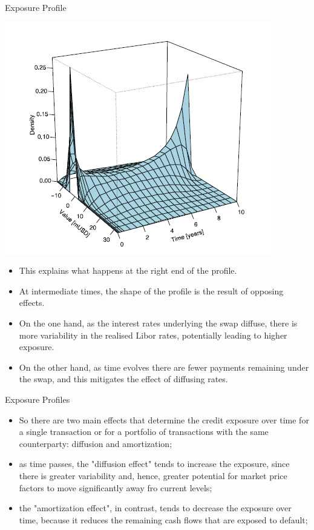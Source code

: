 \documentclass[11pt]{beamer}
\begin{document}
\begin{frame}{Exposure Profile}
\noindent\begin{minipage}{0.5\textwidth}%
\includegraphics[width=\linewidth]{img/profilo_3.png}
\end{minipage}%
\hfill%
\begin{minipage}{0.5\textwidth}
\begin{itemize}
\footnotesize
\item This explains what happens at the right end of the profile. 
\item At intermediate times, the
shape of the profile is the result of opposing effects. 
\item On the one hand, as the interest
rates underlying the swap diffuse, there is more variability in the realised Libor rates,
potentially leading to higher exposure. 
\item On the other hand, as time evolves there are
fewer payments remaining under the swap, and this mitigates the effect of diffusing
rates.
\normalsize
\end{itemize}
\end{minipage}
\end{frame}
\begin{frame}{Exposure Profiles}
\begin{itemize}
\item So there are two main effects that determine the credit exposure over time for a single transaction or for a portfolio of transactions with the same counterparty: diffusion and amortization;
\item as time passes, the "diffusion effect" tends to increase the exposure, since there is greater variability and, hence, greater potential for market price factors to move significantly away fro current levels;
\item the "amortization effect", in contrast, tends to decrease the exposure over time, because it reduces the remaining cash flows that are exposed to default;
\end{itemize}
\end{frame}
\end{document}
